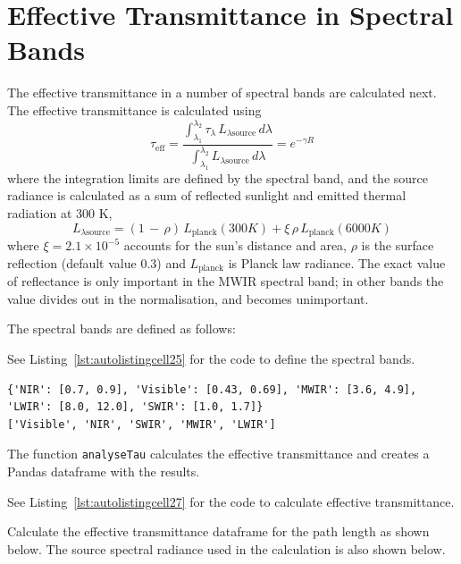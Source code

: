 \documentclass{workpackage}
\begin{document}
\section{Effective Transmittance in Spectral Bands}
\label{sec:EffectiveTransmittanceinSpectralBands}

The effective transmittance in a number of spectral bands are calculated next.  The effective transmittance is calculated using 
\begin{equation}\tau_\textrm{eff} = \frac{\int_{\lambda_1}^{\lambda_2} \tau_\lambda\,L_{\lambda\textrm{source}}\,d\lambda}{\int_{\lambda_1}^{\lambda_2} L_{\lambda\textrm{source}}\,d\lambda} = e^{-\gamma R}\end{equation}
where the integration limits are defined by the spectral band, and the source radiance is calculated as a sum of reflected sunlight and emitted thermal radiation at 300 K, 
\begin{equation}L_{\lambda\textrm{source}} = (1\,-\,\rho)\,L_\textrm{planck}(300K) + \xi\,\rho \,L_\textrm{planck}(6000K)\end{equation}
where $\xi=2.1\times10^{-5}$ accounts for the sun's distance and area, $\rho$ is the surface reflection (default value 0.3) and $L_\textrm{planck}$ is Planck law radiance.  The exact value of reflectance is only important in the MWIR spectral band; in other bands the value divides out in the normalisation, and becomes unimportant.


The spectral bands are defined as follows:




See Listing~\ref{lst:autolistingcell25} for the code to define the spectral bands.


\begin{lstlisting}[style=outcellstyle]
{'NIR': [0.7, 0.9], 'Visible': [0.43, 0.69], 'MWIR': [3.6, 4.9], 'LWIR': [8.0, 12.0], 'SWIR': [1.0, 1.7]}
['Visible', 'NIR', 'SWIR', 'MWIR', 'LWIR']

\end{lstlisting}

The function \verb+analyseTau+ calculates the effective transmittance and creates a Pandas dataframe with the results.




See Listing~\ref{lst:autolistingcell27} for the code to calculate effective transmittance.

Calculate the effective transmittance dataframe for the path length as shown below.  The source spectral radiance used in the calculation is also shown below.
\end{document}
